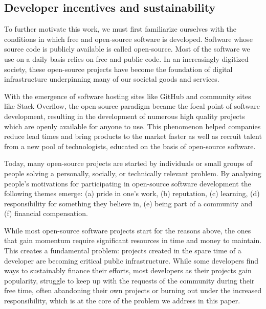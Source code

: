 \subsection{Developer incentives and sustainability}
\label{s:incentives}

To further motivate this work, we must first familiarize ourselves with the
conditions in which free and open-source software is developed. Software whose
source code is publicly available is called open-source. Most of the software
we use on a daily basis relies on free and public code. In an increasingly
digitized society, these open-source projects have become the foundation of
digital infrastructure underpinning many of our societal goods and services.

With the emergence of software hosting sites like GitHub and community sites
like Stack Overflow, the open-source paradigm became the focal point of
software development, resulting in the development of numerous high quality
projects which are openly available for anyone to use. This phenomenon helped
companies reduce lead times and bring products to the market faster as well as
recruit talent from a new pool of technologists, educated on the basis of
open-source software.

Today, many open-source projects are started by individuals or small groups of
people solving a personally, socially, or technically relevant problem. By
analysing people's motivations for participating in open-source software
development the following themes emerge: (a) pride in one's work, (b)
reputation, (c) learning, (d) responsibility for something they believe in, (e)
being part of a community and (f) financial compensation.

While most open-source software projects start for the reasons above, the ones
that gain momentum require significant resources in time and money to maintain.
This creates a fundamental problem: projects created in the spare time of a
developer are becoming critical public infrastructure. While some developers
find ways to sustainably finance their efforts, most developers as their
projects gain popularity, struggle to keep up with the requests of the
community during their free time, often abandoning their own projects or
burning out under the increased responsibility,  which is at the core of the
problem we address in this paper.


